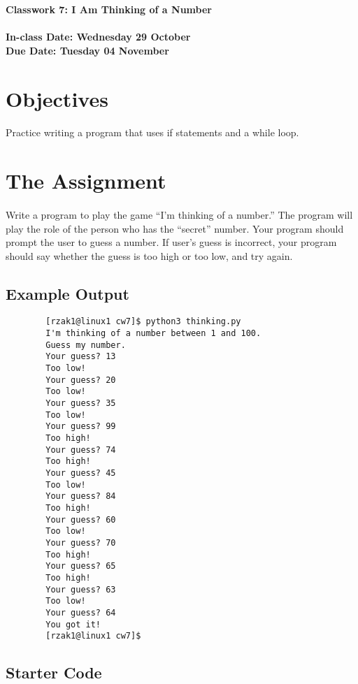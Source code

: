 \documentclass[letter,10pt]{article}
\begin{document}
    
    \huge
    \textbf{Classwork 7: I Am Thinking of a Number}
    \normalsize
    \\ ~~ \\
    \textbf{In-class Date: Wednesday 29 October} \\
    \textbf{Due Date: Tuesday 04 November}
    
    \section*{Objectives}
    \paragraph{}Practice writing a program that uses if statements and a while loop.
    
    \section*{The Assignment}
    \paragraph{}Write a program to play the game ``I'm thinking of a number.'' The program will play the role of the person who has the ``secret'' number. Your program should prompt the user to guess a number. If user's guess is incorrect, your program should say whether the guess is too high or too low, and try again.
    
    \subsection*{Example Output}
    \begin{verbatim}
        [rzak1@linux1 cw7]$ python3 thinking.py
        I'm thinking of a number between 1 and 100.
        Guess my number.
        Your guess? 13
        Too low!
        Your guess? 20
        Too low!
        Your guess? 35
        Too low!
        Your guess? 99
        Too high!
        Your guess? 74
        Too high!
        Your guess? 45
        Too low!
        Your guess? 84
        Too high!
        Your guess? 60
        Too low!
        Your guess? 70
        Too high!
        Your guess? 65
        Too high!
        Your guess? 63
        Too low!
        Your guess? 64
        You got it!
        [rzak1@linux1 cw7]$ 
    \end{verbatim}
    
    \subsection*{Starter Code}
\end{document}
